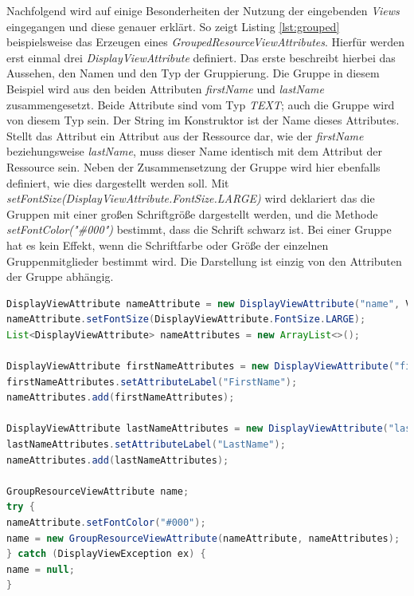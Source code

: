Nachfolgend wird auf einige Besonderheiten der Nutzung der eingebenden \textit{Views} eingegangen und diese genauer erklärt. So zeigt Listing \ref{lst:grouped} beispielsweise das Erzeugen eines \textit{GroupedResourceViewAttributes}. Hierfür werden erst einmal drei \textit{DisplayViewAttribute} definiert. Das erste beschreibt hierbei das Aussehen, den Namen und den Typ der Gruppierung. Die Gruppe in diesem Beispiel wird aus den beiden Attributen \textit{firstName} und \textit{lastName} zusammengesetzt. Beide Attribute sind vom Typ \textit{TEXT}; auch die Gruppe wird von diesem Typ sein. Der String im Konstruktor ist der Name dieses Attributes. Stellt das Attribut ein Attribut aus der Ressource dar, wie der \textit{firstName} beziehungsweise \textit{lastName}, muss dieser Name identisch mit dem Attribut der Ressource sein. Neben der Zusammensetzung der Gruppe wird hier ebenfalls definiert, wie dies dargestellt werden soll. Mit \textit{setFontSize(DisplayViewAttribute.FontSize.LARGE)} wird deklariert das die Gruppen mit einer großen Schriftgröße dargestellt werden, und die Methode \textit{setFontColor("\#000")} bestimmt, dass die Schrift schwarz ist. Bei einer Gruppe hat es kein Effekt, wenn die Schriftfarbe oder Größe der einzelnen Gruppenmitglieder bestimmt wird. Die Darstellung ist einzig von den Attributen der Gruppe abhängig.

\newpage

\begin{lstlisting}[label=lst:grouped,
language=java,
firstnumber=1,
caption=Erstellung eines \textit{GroupedResourceViewAttributes}.]		
DisplayViewAttribute nameAttribute = new DisplayViewAttribute("name", ViewAttribute.AttributeType.TEXT);
nameAttribute.setFontSize(DisplayViewAttribute.FontSize.LARGE);
List<DisplayViewAttribute> nameAttributes = new ArrayList<>();

DisplayViewAttribute firstNameAttributes = new DisplayViewAttribute("firstName", ViewAttribute.AttributeType.TEXT);
firstNameAttributes.setAttributeLabel("FirstName");
nameAttributes.add(firstNameAttributes);

DisplayViewAttribute lastNameAttributes = new DisplayViewAttribute("lastName", ViewAttribute.AttributeType.TEXT);
lastNameAttributes.setAttributeLabel("LastName");
nameAttributes.add(lastNameAttributes);

GroupResourceViewAttribute name;
try {
nameAttribute.setFontColor("#000");
name = new GroupResourceViewAttribute(nameAttribute, nameAttributes);
} catch (DisplayViewException ex) {
name = null;
}
\end{lstlisting}

